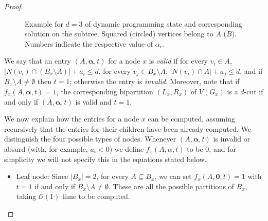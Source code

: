 \documentclass[a4paper,UKenglish,cleveref, autoref]{lipics-v2019}
\newcommand{\balpha}{\boldsymbol{\alpha}}
\newcommand{\bigO}[1]{\mathcal{O}\!\left(#1\right)}
\newcommand{\tdef}[1]{\emph{#1}}
\begin{document}
\begin{proof}
\begin{figure}[!htb]
\begin{tikzpicture}[rotate = 90]
        \end{tikzpicture}
        \caption{\centering Example for $d=3$ of dynamic programming state and corresponding solution on the subtree. Squared (circled) vertices belong to $A$ ($B$). Numbers indicate the respective value of $\alpha_i$.\label{fig:treewidth}}
    \end{figure}

    We say that an entry $(A, \balpha, t)$ for a node $x$ is \tdef{valid} if for every $v_i \in A$, $|N(v_i) \cap (B_x \setminus A)| + a_i \leq d$, for every $v_j \in B_x \setminus A$, $|N(v_i) \cap A| + a_j \leq d$, and if $B_x \setminus A \neq \emptyset$ then $t = 1$; otherwise the entry is \tdef{invalid}. Moreover, note that if $f_x(A, \balpha, t)=1$, the corresponding bipartition $(L_x,R_x)$ of $V(G_x)$ is a $d$-cut if and only if $(A, \balpha, t)$ is valid and $t = 1$.


    We now explain how the entries for a node $x$ can be computed, assuming recursively that the entries for their children have been already computed. We distinguish the four possible types of nodes. Whenever $(A, \balpha, t)$ is invalid or absurd (with, for example, $a_i < 0$) we define $f_x(A, \alpha, t)$ to be $0$, and for simplicity we will not specify this in the equations stated below.

    \begin{itemize}
        \item Leaf node: Since $|B_x| = 2$, for every $A \subseteq B_x$, we can set $f_x(A, \boldsymbol{0}, t) = 1$ with $t = 1$ if and only if $B_x \setminus A \neq \emptyset$.
        These are all the possible partitions of $B_x$, taking $\bigO{1}$ time to be computed.


\end{itemize}
\end{proof}
\end{document}
